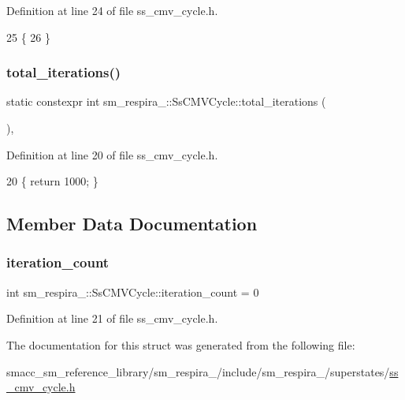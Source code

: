 Definition at line 24 of file ss\+\_\+cmv\+\_\+cycle.\+h.


\begin{DoxyCode}
25     \{
26     \}
\end{DoxyCode}
\mbox{\label{structsm__respira__1_1_1SsCMVCycle_af33c1d460dcea6c9dd5275f860b53aee}} 
\subsubsection{\texorpdfstring{total\+\_\+iterations()}{total\_iterations()}}
{\footnotesize\ttfamily static constexpr int sm\+\_\+respira\+\_\+::\+Ss\+C\+M\+V\+Cycle\+::total\+\_\+iterations (\begin{DoxyParamCaption}{ }\end{DoxyParamCaption})\hspace{0.3cm}{\ttfamily [inline]}, {\ttfamily [static]}}



Definition at line 20 of file ss\+\_\+cmv\+\_\+cycle.\+h.


\begin{DoxyCode}
20 \{ \textcolor{keywordflow}{return} 1000; \}
\end{DoxyCode}


\subsection{Member Data Documentation}
\mbox{\label{structsm__respira__1_1_1SsCMVCycle_a201c2de59431e5e5db575bede83a9f57}} 
\subsubsection{\texorpdfstring{iteration\+\_\+count}{iteration\_count}}
{\footnotesize\ttfamily int sm\+\_\+respira\+\_\+::\+Ss\+C\+M\+V\+Cycle\+::iteration\+\_\+count = 0}



Definition at line 21 of file ss\+\_\+cmv\+\_\+cycle.\+h.



The documentation for this struct was generated from the following file\+:\begin{DoxyCompactItemize}
\item 
smacc\+\_\+sm\+\_\+reference\+\_\+library/sm\+\_\+respira\+\_/include/sm\+\_\+respira\+\_/superstates/\hyperlink{ss__cmv__cycle_8h}{ss\+\_\+cmv\+\_\+cycle.\+h}\end{DoxyCompactItemize}

